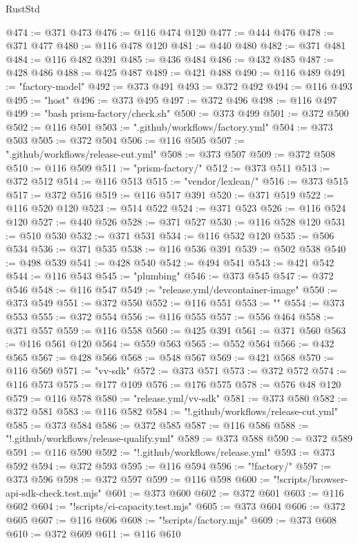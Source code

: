 \begin{lexlean}{RustStd}
\begin{coremodule}
@474 := @371 @473
@476 := @116 @474 @120
@477 := @444 @476
@478 := @371 @477
@480 := @116 @478 @120
@481 := @440 @480
@482 := @371 @481
@484 := @116 @482 @391
@485 := @436 @484
@486 := @432 @485
@487 := @428 @486
@488 := @425 @487
@489 := @421 @488
@490 := @116 @489
@491 := "factory-model"
@492 := @373 @491
@493 := @372 @492
@494 := @116 @493
@495 := "host"
@496 := @373 @495
@497 := @372 @496
@498 := @116 @497
@499 := "bash prism-factory/check.sh"
@500 := @373 @499
@501 := @372 @500
@502 := @116 @501
@503 := ".github/workflows/factory.yml"
@504 := @373 @503
@505 := @372 @504
@506 := @116 @505
@507 := ".github/workflows/release-cut.yml"
@508 := @373 @507
@509 := @372 @508
@510 := @116 @509
@511 := "prism-factory/"
@512 := @373 @511
@513 := @372 @512
@514 := @116 @513
@515 := "vendor/lexlean/"
@516 := @373 @515
@517 := @372 @516
@519 := @116 @517 @391
@520 := @371 @519
@522 := @116 @520 @120
@523 := @514 @522
@524 := @371 @523
@526 := @116 @524 @120
@527 := @440 @526
@528 := @371 @527
@530 := @116 @528 @120
@531 := @510 @530
@532 := @371 @531
@534 := @116 @532 @120
@535 := @506 @534
@536 := @371 @535
@538 := @116 @536 @391
@539 := @502 @538
@540 := @498 @539
@541 := @428 @540
@542 := @494 @541
@543 := @421 @542
@544 := @116 @543
@545 := "plumbing"
@546 := @373 @545
@547 := @372 @546
@548 := @116 @547
@549 := "release.yml/devcontainer-image"
@550 := @373 @549
@551 := @372 @550
@552 := @116 @551
@553 := ""
@554 := @373 @553
@555 := @372 @554
@556 := @116 @555
@557 := @556 @464
@558 := @371 @557
@559 := @116 @558
@560 := @425 @391
@561 := @371 @560
@563 := @116 @561 @120
@564 := @559 @563
@565 := @552 @564
@566 := @432 @565
@567 := @428 @566
@568 := @548 @567
@569 := @421 @568
@570 := @116 @569
@571 := "vv-sdk"
@572 := @373 @571
@573 := @372 @572
@574 := @116 @573
@575 := @177 @109
@576 := @176 @575
@578 := @576 @48 @120
@579 := @116 @578
@580 := "release.yml/vv-sdk"
@581 := @373 @580
@582 := @372 @581
@583 := @116 @582
@584 := "!.github/workflows/release-cut.yml"
@585 := @373 @584
@586 := @372 @585
@587 := @116 @586
@588 := "!.github/workflows/release-qualify.yml"
@589 := @373 @588
@590 := @372 @589
@591 := @116 @590
@592 := "!.github/workflows/release.yml"
@593 := @373 @592
@594 := @372 @593
@595 := @116 @594
@596 := "!factory/"
@597 := @373 @596
@598 := @372 @597
@599 := @116 @598
@600 := "!scripts/browser-api-sdk-check.test.mjs"
@601 := @373 @600
@602 := @372 @601
@603 := @116 @602
@604 := "!scripts/ci-capacity.test.mjs"
@605 := @373 @604
@606 := @372 @605
@607 := @116 @606
@608 := "!scripts/factory.mjs"
@609 := @373 @608
@610 := @372 @609
@611 := @116 @610

\end{coremodule}
\end{lexlean}
